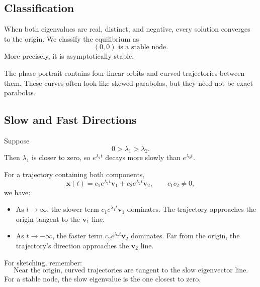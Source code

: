 \documentclass[10pt,letterpaper]{article}
\begin{document}
\subsection{Classification}

When both eigenvalues are real, distinct, and negative,
every solution converges to the origin. We classify
the equilibrium as
\[
\boxed{(0,0)\text{ is a stable node.}}
\]
More precisely, it is asymptotically stable.

The phase portrait contains four linear orbits and
curved trajectories between them. These curves often
look like skewed parabolas, but they need not be
exact parabolas.

\subsection{Slow and Fast Directions}

Suppose
\[
0>\lambda_1>\lambda_2.
\]
Then $\lambda_1$ is closer to zero, so
$e^{\lambda_1t}$ decays more slowly than
$e^{\lambda_2t}$.

For a trajectory containing both components,
\[
\mathbf{x}(t)
=c_1e^{\lambda_1t}\mathbf{v}_1
+c_2e^{\lambda_2t}\mathbf{v}_2,
\qquad c_1c_2\ne0,
\]
we have:
\begin{itemize}
    \item As $t\to\infty$, the slower term
    $c_1e^{\lambda_1t}\mathbf{v}_1$ dominates.
    The trajectory approaches the origin tangent
    to the $\mathbf{v}_1$ line.

    \item As $t\to-\infty$, the faster term
    $c_2e^{\lambda_2t}\mathbf{v}_2$ dominates.
    Far from the origin, the trajectory's direction
    approaches the $\mathbf{v}_2$ line.
\end{itemize}

For sketching, remember:
\[
\boxed{
\text{Near the origin, curved trajectories are tangent
to the slow eigenvector line.}
}
\]
For a stable node, the slow eigenvalue is the one
closest to zero.
\end{document}
